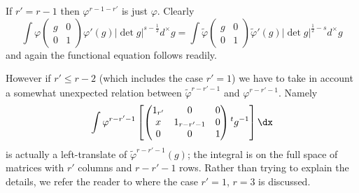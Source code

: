 If $r'=r-1$ then $\varphi^{r-1-r'}$ is just $\varphi$. Clearly
$$
\int \varphi
\left(
\begin{matrix}
g & 0\\
0 & 1
\end{matrix}
\right)
\varphi'(g)|\det g|^{s-\frac{1}{2}}d^{\times}g=\int\widetilde{\varphi}
\left(
\begin{matrix}
g & 0\\
0 & 1
\end{matrix}
\right)
\widetilde{\varphi}'(g)|\det g|^{\frac{1}{2}-s}d^{\times}g
$$
and again the functional equation follows readily.

However if $r'\leq r-2$ (which includes the case $r'=1$) we have to take in account a somewhat unexpected relation between $\widetilde{\varphi}^{r-r'-1}$ and $\varphi^{r-r'-1}$. Namely
$$
\int \varphi^{r-r'-1}\left[\left(
\begin{matrix}
1_{r'} & 0 & 0\\
x & 1_{r-r'-1} & 0\\
0 & 0 & 1
\end{matrix}
\right){}^{t}g^{-1}\right]\dx
$$
is actually a left-translate of $\widetilde{\varphi}^{r-r'-1}(g)$; the integral is on the full space of matrices with $r'$ columns and $r-r'-1$ rows. Rather than trying to explain the details, we refer the reader to \cite{art5-J-S-P1} where the case $r'=1$, $r=3$ is discussed.

